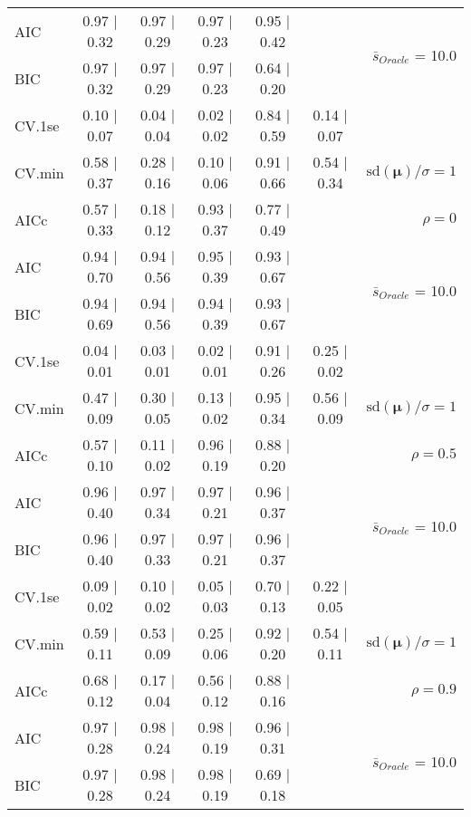 \begin{table}
\begin{center}
\begin{tabular}{l*{5}{c}|r}
AIC & 0.97 $\mid$ 0.32 & 0.97 $\mid$ 0.29 & 0.97 $\mid$ 0.23 & 0.95 $\mid$ 0.42 & &  \multirow{2}{*}{$\bar{s}_{Oracle}$ = 10.0} \\
BIC & 0.97 $\mid$ 0.32 & 0.97 $\mid$ 0.29 & 0.97 $\mid$ 0.23 & 0.64 $\mid$ 0.20 & &  \\
 \hline 
CV.1se & 0.10 $\mid$ 0.07 & 0.04 $\mid$ 0.04 & 0.02 $\mid$ 0.02 & 0.84 $\mid$ 0.59 & 0.14 $\mid$ 0.07 & \\
CV.min & 0.58 $\mid$ 0.37 & 0.28 $\mid$ 0.16 & 0.10 $\mid$ 0.06 & 0.91 $\mid$ 0.66 & 0.54 $\mid$ 0.34 &  $\mathrm{sd}(\mathbf{\mu})/\sigma=1$ \\
AICc & 0.57 $\mid$ 0.33 & 0.18 $\mid$ 0.12 & 0.93 $\mid$ 0.37 & 0.77 $\mid$ 0.49 & & $\rho=0$ \\
AIC & 0.94 $\mid$ 0.70 & 0.94 $\mid$ 0.56 & 0.95 $\mid$ 0.39 & 0.93 $\mid$ 0.67 & &  \multirow{2}{*}{$\bar{s}_{Oracle}$ = 10.0} \\
BIC & 0.94 $\mid$ 0.69 & 0.94 $\mid$ 0.56 & 0.94 $\mid$ 0.39 & 0.93 $\mid$ 0.67 & &  \\
 \hline 
CV.1se & 0.04 $\mid$ 0.01 & 0.03 $\mid$ 0.01 & 0.02 $\mid$ 0.01 & 0.91 $\mid$ 0.26 & 0.25 $\mid$ 0.02 & \\
CV.min & 0.47 $\mid$ 0.09 & 0.30 $\mid$ 0.05 & 0.13 $\mid$ 0.02 & 0.95 $\mid$ 0.34 & 0.56 $\mid$ 0.09 &  $\mathrm{sd}(\mathbf{\mu})/\sigma=1$ \\
AICc & 0.57 $\mid$ 0.10 & 0.11 $\mid$ 0.02 & 0.96 $\mid$ 0.19 & 0.88 $\mid$ 0.20 & & $\rho=0.5$ \\
AIC & 0.96 $\mid$ 0.40 & 0.97 $\mid$ 0.34 & 0.97 $\mid$ 0.21 & 0.96 $\mid$ 0.37 & &  \multirow{2}{*}{$\bar{s}_{Oracle}$ = 10.0} \\
BIC & 0.96 $\mid$ 0.40 & 0.97 $\mid$ 0.33 & 0.97 $\mid$ 0.21 & 0.96 $\mid$ 0.37 & &  \\
 \hline 
CV.1se & 0.09 $\mid$ 0.02 & 0.10 $\mid$ 0.02 & 0.05 $\mid$ 0.03 & 0.70 $\mid$ 0.13 & 0.22 $\mid$ 0.05 & \\
CV.min & 0.59 $\mid$ 0.11 & 0.53 $\mid$ 0.09 & 0.25 $\mid$ 0.06 & 0.92 $\mid$ 0.20 & 0.54 $\mid$ 0.11 &  $\mathrm{sd}(\mathbf{\mu})/\sigma=1$ \\
AICc & 0.68 $\mid$ 0.12 & 0.17 $\mid$ 0.04 & 0.56 $\mid$ 0.12 & 0.88 $\mid$ 0.16 & & $\rho=0.9$ \\
AIC & 0.97 $\mid$ 0.28 & 0.98 $\mid$ 0.24 & 0.98 $\mid$ 0.19 & 0.96 $\mid$ 0.31 & &  \multirow{2}{*}{$\bar{s}_{Oracle}$ = 10.0} \\
BIC & 0.97 $\mid$ 0.28 & 0.98 $\mid$ 0.24 & 0.98 $\mid$ 0.19 & 0.69 $\mid$ 0.18 & &  \\

\end{tabular}
\end{center}
\end{table}
